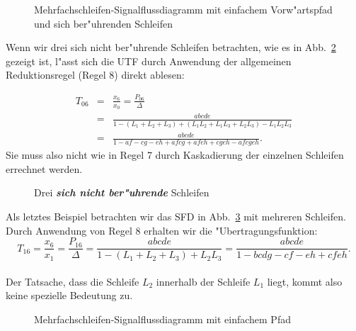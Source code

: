 \begin{figure}[htb!]
\begin{center}
  \caption{Mehrfachschleifen-Signalflussdiagramm mit einfachem
Vorw"artspfad und sich ber"uhrenden Schleifen}\label{SFD18}
\end{center}
\vspace*{-6mm}
\end{figure}
\bsp{} 
\nit Wenn wir drei sich
nicht ber"uhrende Schleifen betrachten, wie es in Abb.~\ref{SFD19} gezeigt
ist, l"asst sich die UTF durch Anwendung der
allgemeinen Reduktionsregel (Regel 8) direkt ablesen:

\begin{eqnarray*}
  T_{06} & = & \frac{x_6}{x_0} = \frac{P_{06}}{\Delta}\\
  & = & \frac{abcde}{1-(L_1 + L_2 + L_3) + (L_1L_2 + L_1L_3 + L_2L_3)- L_1L_2L_3}\\
  & = & \frac{abcde}{1-af-cg-eh+afcg+afeh+cgeh-afcgeh}.
\end{eqnarray*}
Sie muss also nicht wie in Regel 7 durch Kaskadierung der einzelnen
Schleifen errechnet werden. \\
\begin{figure}[htb!]
\vspace*{-2mm}\begin{center}
  \caption{Drei
    \textbf{\emph{sich nicht ber"uhrende}} Schleifen}\label{SFD19}
\end{center}
\vspace*{-7mm}
\end{figure}
\bsp{}
\nit Als letztes Beispiel betrachten wir das SFD in
Abb.~\ref{SFD20} mit mehreren Schleifen. Durch Anwendung von Regel 8
erhalten wir die "Ubertragungsfunktion:\\
\begin{equation*}
  T_{16} = \frac{x_6}{x_1} =  \frac{P_{16}}{\Delta} = \frac{abcde}{1-(L_1+L_2+L_3)+L_2L_3} = \frac{abcde}{1-bcdg -cf -eh +cfeh}.
\end{equation*}\\
\nit Der Tatsache, dass die Schleife $L_2$ innerhalb der Schleife $L_1$
liegt, kommt also keine spezielle Bedeutung zu. \\
\begin{figure}[htb!]
\vspace*{-3mm}\begin{center}
  \caption{Mehrfachschleifen-Signalflussdiagramm mit einfachem Pfad}\label{SFD20}
\end{center}
\vspace*{-7mm}
\end{figure}
 
